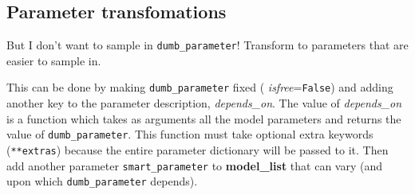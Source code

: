 \documentclass[12pt, letterpaper, preprint]{aastex}
\begin{document}
\subsection{Parameter transfomations}
But I don't want to sample in \texttt{dumb\_parameter}!  Transform to
parameters that are easier to sample in. 

This can be done by making \texttt{dumb\_parameter} fixed ({\it
isfree}=\texttt{False}) and adding another key to the parameter
description, {\it depends\_on}.  The value of {\it depends\_on} is a
function which takes as arguments all the model parameters and returns
the value of \texttt{dumb\_parameter}. This function must take
optional extra keywords (\texttt{**extras}) because the entire
parameter dictionary will be passed to it. Then add another parameter
\texttt{smart\_parameter} to {\bf model\_list} that can vary (and upon
which \texttt{dumb\_parameter} depends).
\end{document}
